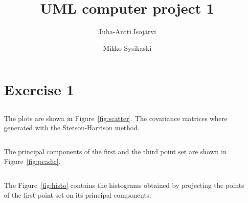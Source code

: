 \documentclass{article}
\begin{document}
\title{UML computer project 1}
\author{Juha-Antti Isojärvi \and Mikko Sysikaski}
\maketitle

\section{Exercise 1}
\subsection{}
The plots are shown in Figure~\ref{fig:scatter}. The covariance matrices where generated with the Stetson-Harrison method.
\subsection{}
The principal components of the first and the third point set are shown in Figure~\ref{fig:pcadir}.
\subsection{}
The Figure~\ref{fig:histo} contains the histograms obtained by projecting the points of the first point set on its principal components.
\subsection{}
\subsection{}
\end{document}
